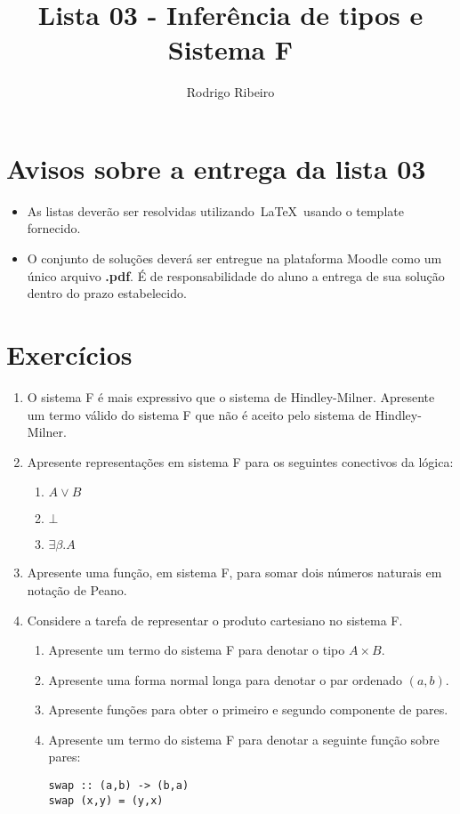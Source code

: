 \documentclass[a4paper]{article}
\theoremstyle{definition}
\begin{document}
  \title{Lista 03 - Inferência de tipos e Sistema F}
  \author{Rodrigo Ribeiro}

  \maketitle


  \pagestyle{fancy}

  \section*{Avisos sobre a entrega da lista 03}

  \begin{itemize}
    \item As listas deverão ser resolvidas utilizando~\LaTeX~usando o template fornecido.
    \item O conjunto de soluções deverá ser entregue na plataforma Moodle como um único
        arquivo \textbf{.pdf}. É de responsabilidade do aluno a entrega de sua solução dentro do
        prazo estabelecido.
  \end{itemize}

  \section*{Exercícios}

  \begin{enumerate}
    \item O sistema F é mais expressivo que o sistema de Hindley-Milner. Apresente um termo válido
          do sistema F que não é aceito pelo sistema de Hindley-Milner.
    \item Apresente representações em sistema F para os seguintes conectivos da lógica:
          \begin{enumerate}
            \item $A\lor B$
            \item $\bot$
            \item $\exists \beta. A$
          \end{enumerate}
    \item Apresente uma função, em sistema F, para somar dois números naturais em notação de Peano.
    \item Considere a tarefa de representar o produto cartesiano no sistema F.
          \begin{enumerate}
            \item Apresente um termo do sistema F para denotar o tipo $A \times B$.
            \item Apresente uma forma normal longa para denotar o par ordenado $(a,b)$.
            \item Apresente funções para obter o primeiro e segundo componente de pares.
            \item Apresente um termo do sistema F para denotar a seguinte função sobre pares:
\begin{verbatim}
swap :: (a,b) -> (b,a)
swap (x,y) = (y,x)
\end{verbatim}
          \end{enumerate}
  \end{enumerate}
\end{document}
